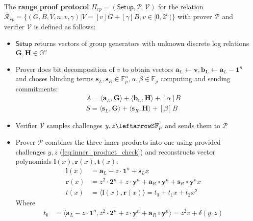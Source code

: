 \documentclass[../lecture-notes-148x210.tex]{subfiles}
\begin{document}
\begin{definition}
    The \textbf{range proof protocol} $\Pi_{rp} = (\mathsf{Setup}, \mathcal{P,V})$ for the relation $\mathcal{R}_{rp} = \{ (G, B, V, n; v, \gamma) \vert V = [v]G + [\gamma]B, v \in [0, 2^n) \}$ with prover $\mathcal{P}$ and verifier $\mathcal{V}$ is defined as follows:
    \begin{itemize}
        \item $\mathsf{Setup}$ returns vectors of group generators with unknown discrete log relations $\mathbf{G, H} \in \mathbb{G}^n$
        \item Prover does bit decomposition of $v$ to obtain vectors $\mathbf{a}_L \gets \mathbf{v}, \mathbf{b_L} \gets \mathbf{a}_L - \mathbf{1}^n$ and choses blinding terms $\mathbf{s}_L, \mathbf{s}_R \in \mathbb{F}_p^n, \alpha, \beta \in \mathbb{F}_p$ computing and sending commitments:
            \begin{align*}
                A = \langle \mathbf{a}_L, \mathbf{G} \rangle + \langle \mathbf{b_L}, \mathbf{H} \rangle + [\alpha]B\\
                S = \langle \mathbf{s}_L, \mathbf{G} \rangle + \langle \mathbf{s}_R, \mathbf{H} \rangle + [\beta]B
            \end{align*}
        \item Verifier $\mathcal{V}$ samples challenges $y, z \leftarrowS \mathbb{F}_p$ and sends them to $\mathcal{P}$
        \item Prover $\mathcal{P}$ combines the three inner products into one using provided challenges $y,z$ (\ref{eq:inner_product_check}) and reconstructs vector  polynomials $\mathbf{l}(x), \mathbf{r}(x), \mathbf{t}(x)$:
            \begin{equation*}
                \begin{aligned}
                    \mathbf{l}(x) &= \mathbf{a}_L - z \cdot \mathbf{1}^n + \mathbf{s}_L x\\
                    \mathbf{r}(x) &= z^2 \cdot \mathbf{2}^n + z \cdot \mathbf{y}^n + \mathbf{a}_R \circ \mathbf{y}^n + \mathbf{s}_R \circ \mathbf{y}^n x\\
                    t(x) &= \langle \mathbf{l}(x), \mathbf{r}(x) \rangle = t_0 + t_1 x + t_2 x^2
                \end{aligned}
            \end{equation*}
            Where 
            \begin{equation*}
                \begin{aligned}
                    t_0 &= \langle \mathbf{a}_L - z \cdot \mathbf{1}^n, z^2 \cdot \mathbf{2}^n + z \cdot \mathbf{y}^n + \mathbf{a}_R \circ \mathbf{y}^n\rangle = z^2v + \delta(y,z)\\

\end{aligned}
\end{equation*}
\end{itemize}
\end{definition}
\end{document}
